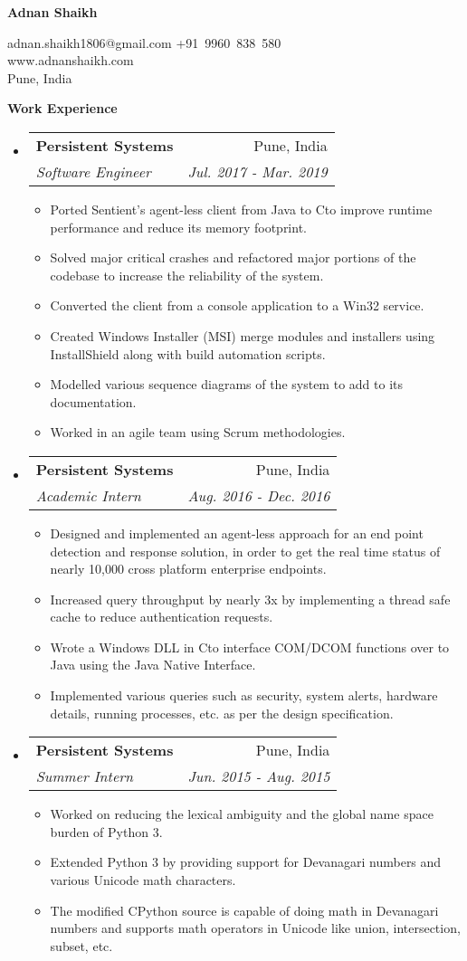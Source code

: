 \documentclass[letterpaper,12pt]{article}
\makeatletter
\def\CC{{C\nolinebreak[4]\hspace{-.05em}\raisebox{.4ex}{\tiny\bf ++ }}}
\newcommand{\resitem}[1]{\item #1 \vspace{-2pt}}
\newcommand{\resheading}[1]{{\large \colorbox{mygrey}{\begin{minipage}{\textwidth}{\textbf{#1 \vphantom{p\^{E}}}}\end{minipage}}}}
\newcommand{\ressubheading}[4]{
    \begin{tabular*}{7.0in}{l@{\extracolsep{\fill}}r}
      \textbf{#1} & #2 \\
      \textit{#3} & \textit{#4} \\
    \end{tabular*}\vspace{-6pt}}
\makeatother
\begin{document}
  
  \begin{center}
    \textbf{\Large Adnan Shaikh}
  \end{center}
  
  \begin{center}
    adnan.shaikh1806@gmail.com \vert +91~9960~838~580\\
    www.adnanshaikh.com\\
    Pune, India \\
  \end{center}
  
  \vspace{0.1in}
  
  \resheading{Work Experience}
  \begin{itemize}
  \item
    \ressubheading{Persistent Systems}{Pune, India}{Software Engineer}{Jul. 2017 - Mar. 2019}
    \begin{itemize}
      \resitem{Ported Sentient's agent-less client from Java to \CC to improve runtime performance and reduce its memory footprint.}
      \resitem{Solved major critical crashes and refactored major portions of the codebase to increase the reliability of the system.}
      \resitem{Converted the client from a console application to a Win32 service.}
      \resitem{Created Windows Installer (MSI) merge modules and installers using InstallShield along with build automation scripts.}
      \resitem{Modelled various sequence diagrams of the system to add to its documentation.}
      \resitem{Worked in an agile team using Scrum methodologies.}
    \end{itemize}
  \item
    \ressubheading{Persistent Systems}{Pune, India}{Academic Intern}{Aug. 2016 - Dec. 2016}
    \begin{itemize}
      \resitem{Designed and implemented an agent-less approach for an end point detection and response solution, in order to get the real time status of nearly 10,000 cross platform enterprise endpoints.}
      \resitem{Increased query throughput by nearly 3x by implementing a thread safe cache to reduce authentication requests.}
      \resitem{Wrote a Windows DLL in \CC to interface COM/DCOM functions over to Java using the Java Native Interface.}
      \resitem{Implemented various queries such as security, system alerts, hardware details, running processes, etc. as per the design specification.}
    \end{itemize}
  \item
    \ressubheading{Persistent Systems}{Pune, India}{Summer Intern}{Jun. 2015 - Aug. 2015}
    \begin{itemize}
      \resitem{Worked on reducing the lexical ambiguity and the global name space burden of Python 3.}
      \resitem{Extended Python 3 by providing support for Devanagari numbers and various Unicode math characters.}
      \resitem{The modified CPython source is capable of doing math in Devanagari numbers and supports math operators in Unicode like union, intersection, subset, etc.}
    \end{itemize}
  \end{itemize}
  
\end{document}
